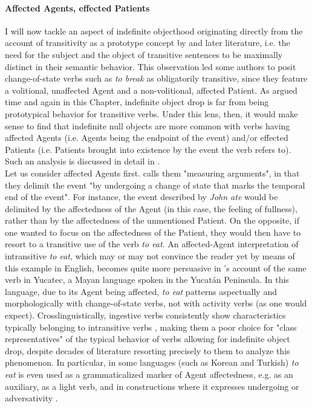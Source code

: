 \paragraph{Affected Agents, effected Patients} 

I will now tackle an aspect of indefinite objecthood originating directly from the account of transitivity as a prototype concept by \textcite{HopperThompson1980} and later literature, i.e. the need for the subject and the object of transitive sentences to be maximally distinct in their semantic behavior. This observation led some authors to posit change-of-state verbs such as \textit{to break} as obligatorily transitive, since they feature a volitional, unaffected Agent and a non-volitional, affected Patient. As argued time and again in this Chapter, indefinite object drop is far from being prototypical behavior for transitive verbs. Under this lens, then, it would make sense to find that indefinite null objects are more common with verbs having affected Agents (i.e. Agents being the endpoint of the event) and/or effected Patients (i.e. Patients brought into existence by the event the verb refers to). Such an analysis is discussed in detail in \textcite{Naess2007}.\\
Let us consider affected Agents first. \textcite[158]{tenny1994aspectual} calls them "measuring arguments", in that they delimit the event "by undergoing a change of state that marks the temporal end of the event". For instance, the event described by \textit{John ate} would be delimited by the affectedness of the Agent (in this case, the feeling of fullness), rather than by the affectedness of the unmentioned Patient. On the opposite, if one wanted to focus on the affectedness of the Patient, they would then have to resort to a transitive use of the verb \textit{to eat}. An affected-Agent interpretation of intransitive \textit{to eat}, which may or may not convince the reader yet by means of this example in English, becomes quite more persuasive in \textcite[61-63]{Naess2007}'s account of the same verb in Yucatec, a Mayan language spoken in the Yucatán Peninsula. In this language, due to its Agent being affected, \textit{to eat} patterns aspectually and morphologically with change-of-state verbs, not with activity verbs (as one would expect). Crosslinguistically, ingestive verbs consistently show characteristics typically belonging to intransitive verbs \parencite{Amberber2009}, making them a poor choice for "class representatives" of the typical behavior of verbs allowing for indefinite object drop, despite decades of literature resorting precisely to them to analyze this phenomenon. In particular, in some languages (such as Korean and Turkish) \textit{to eat} is even used as a grammaticalized marker of Agent affectedness, e.g. as an auxiliary, as a light verb, and in constructions where it expresses undergoing or adversativity \parencite[75]{Naess2007}.

